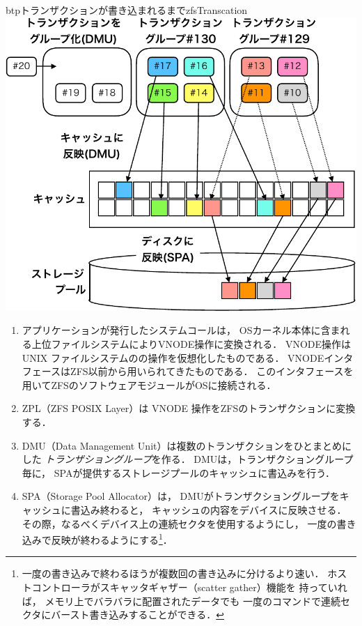 \begin{myfig}{btp}{トランザクションが書き込まれるまで}{zfsTranscation}
  \centering\includegraphics[scale=0.7]{Fig/zfsTranscation-crop.pdf}
\end{myfig}
  
\begin{enumerate}
\item アプリケーションが発行したシステムコールは，
  OSカーネル本体に含まれる上位ファイルシステムによりVNODE操作に変換される．
  VNODE操作は UNIX ファイルシステムの\inode の操作を仮想化したものである．
  VNODEインタフェースはZFS以前から用いられてきたものである．
  このインタフェースを用いてZFSのソフトウェアモジュールがOSに接続される．

\item ZPL（ZFS POSIX Layer）は VNODE 操作をZFSのトランザクションに変換する．

\item DMU（Data Management Unit）は複数のトランザクションをひとまとめにした
  \emph{トランザショングループ}を作る．
  DMUは，トランザクショングループ毎に，
  SPAが提供するストレージプールのキャッシュに書込みを行う．

\item SPA（Storage Pool Allocator）は，
  DMUがトランザクショングループをキャッシュに書込み終わると，
  キャッシュの内容をデバイスに反映させる．
  その際，なるべくデバイス上の連続セクタを使用するようにし，
  一度の書き込みで反映が終わるようにする\footnote{
    一度の書き込みで終わるほうが複数回の書き込みに分けるより速い．
    ホストコントローラがスキャッタギャザー（scatter gather）機能を
    持っていれば，
    メモリ上でバラバラに配置されたデータでも
    一度のコマンドで連続セクタにバースト書き込みすることができる．
  }．
\end{enumerate}

